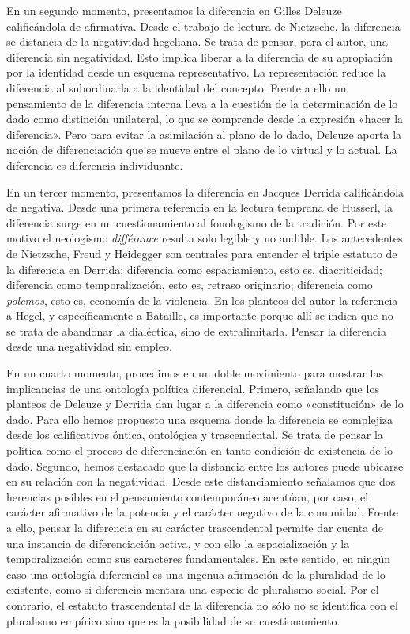 En un segundo momento, presentamos la diferencia en Gilles Deleuze calificándola de afirmativa. Desde el trabajo de lectura de Nietzsche, la diferencia se distancia de la negatividad hegeliana. Se trata de pensar, para el autor, una diferencia sin negatividad. Esto implica liberar a la diferencia de su apropiación por la identidad desde un esquema representativo. La representación reduce la diferencia al subordinarla a la identidad del concepto. Frente a ello un pensamiento de la diferencia interna lleva a la cuestión de la determinación de lo dado como distinción unilateral, lo que se comprende desde la expresión «hacer la diferencia». Pero para evitar la asimilación al plano de lo dado, Deleuze aporta la noción de diferenciación que se mueve entre el plano de lo virtual y lo actual. La diferencia es diferencia individuante.

En un tercer momento, presentamos la diferencia en Jacques Derrida calificándola de negativa. Desde una primera referencia en la lectura temprana de Husserl, la diferencia surge en un cuestionamiento al fonologismo de la tradición. Por este motivo el neologismo \emph{différance} resulta solo legible y no audible. Los antecedentes de Nietzsche, Freud y Heidegger son centrales para entender el triple estatuto de la diferencia en Derrida: diferencia como espaciamiento, esto es, diacriticidad; diferencia como temporalización, esto es, retraso originario; diferencia como \emph{polemos}, esto es, economía de la violencia. En los planteos del autor la referencia a Hegel, y específicamente a Bataille, es importante porque allí se indica que no se trata de abandonar la dialéctica, sino de extralimitarla. Pensar la diferencia desde una negatividad sin empleo.

En un cuarto momento, procedimos en un doble movimiento para mostrar las implicancias de una ontología política diferencial. Primero, señalando que los planteos de Deleuze y Derrida dan lugar a la diferencia como «constitución» de lo dado. Para ello hemos propuesto una esquema donde la diferencia se complejiza desde los calificativos óntica, ontológica y trascendental. Se trata de pensar la política como el proceso de diferenciación en tanto condición de existencia de lo dado. Segundo, hemos destacado que la distancia entre los autores puede ubicarse en su relación con la negatividad. Desde este distanciamiento señalamos que dos herencias posibles en el pensamiento contemporáneo acentúan, por caso, el carácter afirmativo de la potencia y el carácter negativo de la comunidad. Frente a ello, pensar la diferencia en su carácter trascendental permite dar cuenta de una instancia de diferenciación activa, y con ello la espacialización y la temporalización como sus caracteres fundamentales. En este sentido, en ningún caso una ontología diferencial es una ingenua afirmación de la pluralidad de lo existente, como si diferencia mentara una especie de pluralismo social. Por el contrario, el estatuto trascendental de la diferencia no sólo no se identifica con el pluralismo empírico sino que es la posibilidad de su cuestionamiento.

